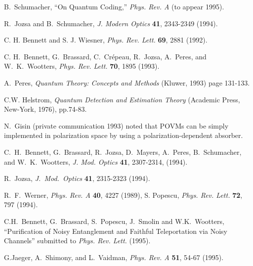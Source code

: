 \begin{thebibliography}{99}
 
 B.~Schumacher, ``On Quantum Coding,''
{\em Phys. Rev. A\/} (to appear 1995).
 
 R.~Jozsa and B.~Schumacher,
{\em J. Modern Optics\/} {\bf 41}, 2343-2349 (1994).
 
 C. H. Bennett and S. J. Wiesner, {\em Phys. Rev. Lett.\/}
{\bf69}, 2881 (1992).
 
 C. H.~Bennett, G.~Brassard, C.~Cr\'epeau, R.~Jozsa,
A.~Peres, and W.~K.~Wootters, {\em Phys. Rev. Lett.} {\bf 70}, 1895
(1993).
 
 A.~Peres, {\em Quantum Theory: Concepts and Methods\/}
(Kluwer, 1993) page 131-133.
 
 C.W. Helstrom,
{\em Quantum Detection and Estimation Theory}
(Academic Press, New-York, 1976), pp.74-83.
 
 N.~Gisin (private communication 1993) noted that
POVMs can be simply implemented in polarization space by
using a polarization-dependent absorber.
 
 C.~H.~Bennett, G.~Brassard, R.~Jozsa,
D.~Mayers, A.~Peres, B.~Schumacher, and W.~K.~Wootters,
{\em J. Mod. Optics\/} {\bf 41}, 2307-2314, (1994).
 
 R.~Jozsa, {\em J.~Mod.~Optics\/} {\bf 41}, 2315-2323 (1994).
 
 R.~F.~Werner, {\em Phys. Rev. A\/} {\bf 40},
4227 (1989), S. Popescu, {\em Phys. Rev. Lett.\/} {\bf 72}, 797 (1994).
 
 C.H.~Bennett, G.~Brassard, S.~Popescu, J.~Smolin and
W.K.~Wootters, ``Purification of Noisy Entanglement and Faithful
Teleportation via Noisy Channels'' submitted to {\em Phys. Rev. Lett.\/} (1995).
 
 G.Jaeger, A.~Shimony, and L.~Vaidman,
{\em Phys. Rev. A\/} {\bf 51}, 54-67 (1995).


\end{thebibliography}


 
